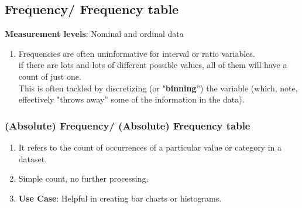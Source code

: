 \subsection{Frequency/ Frequency table \cite{statistics/book/Statistics-for-Data-Scientists/Maurits-Kaptein}}\label{Data/Describing Data/Frequency or Frequency table}

\textbf{Measurement levels}: Nominal and ordinal data

\vspace{0.3cm}

\begin{enumerate}
    \item Frequencies are often uninformative for interval or ratio variables. \cite{statistics/book/Statistics-for-Data-Scientists/Maurits-Kaptein}\\
        if there are lots and lots of different possible values, all of them will have a count of just one. \cite{statistics/book/Statistics-for-Data-Scientists/Maurits-Kaptein}\\
        This is often tackled by discretizing (or "\textbf{binning}”\label{Data/Describing Data/Frequency or Frequency table/binning}) the variable (which, note, effectively "throws away” some of the information in the data). \cite{statistics/book/Statistics-for-Data-Scientists/Maurits-Kaptein}

    
\end{enumerate}


\subsubsection{(Absolute) Frequency/ (Absolute) Frequency table \cite{statistics/book/Statistics-for-Data-Scientists/Maurits-Kaptein}}\label{Data/Describing Data/Frequency or Frequency table/Absolute}

\begin{enumerate}
    \item It refers to the count of occurrences of a particular value or category in a dataset. \cite{common/online/chatgpt}

    \item Simple count, no further processing. \cite{common/online/chatgpt}

    \item \textbf{Use Case}: Helpful in creating bar charts or histograms. \cite{common/online/chatgpt}
\end{enumerate}



